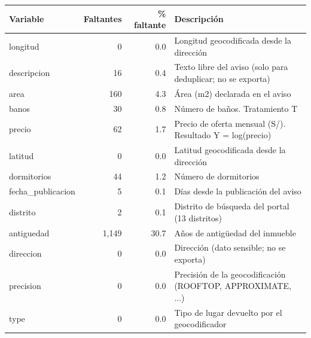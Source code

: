 \begin{tabular}{lrrp{8.2cm}}
\toprule
Variable & Faltantes & \% faltante & Descripción \\
\midrule
longitud & 0 & 0.0 & Longitud geocodificada desde la dirección \\
descripcion & 16 & 0.4 & Texto libre del aviso (solo para deduplicar; no se exporta) \\
area & 160 & 4.3 & Área (m2) declarada en el aviso \\
banos & 30 & 0.8 & Número de baños. Tratamiento T \\
precio & 62 & 1.7 & Precio de oferta mensual (S/). Resultado Y = log(precio) \\
latitud & 0 & 0.0 & Latitud geocodificada desde la dirección \\
dormitorios & 44 & 1.2 & Número de dormitorios \\
fecha\_publicacion & 5 & 0.1 & Días desde la publicación del aviso \\
distrito & 2 & 0.1 & Distrito de búsqueda del portal (13 distritos) \\
antiguedad & 1,149 & 30.7 & Años de antigüedad del inmueble \\
direccion & 0 & 0.0 & Dirección (dato sensible; no se exporta) \\
precision & 0 & 0.0 & Precisión de la geocodificación (ROOFTOP, APPROXIMATE, ...) \\
type & 0 & 0.0 & Tipo de lugar devuelto por el geocodificador \\
\bottomrule
\end{tabular}